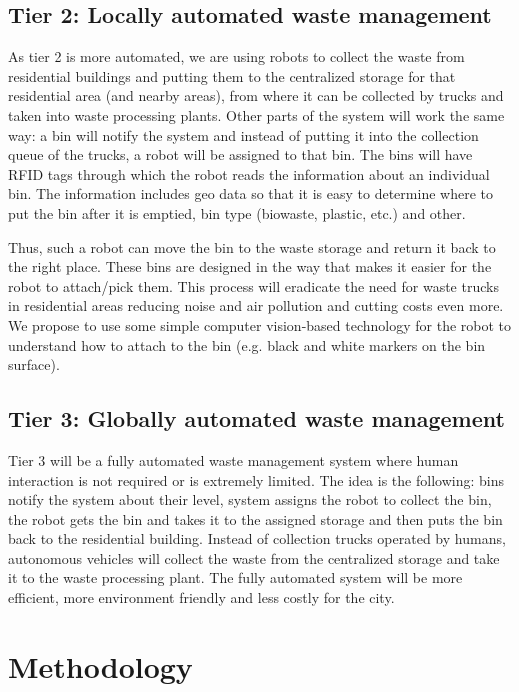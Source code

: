 \documentclass{article}
\begin{document}
\subsection{Tier 2: Locally automated waste management}

As tier 2 is more automated, we are using robots to collect the waste from residential buildings and
putting them to the centralized storage for that residential area (and nearby areas), from where it
can be collected by trucks and taken into waste processing plants. Other parts of the system will
work the same way: a bin will notify the system and instead of putting it into the collection queue
of the trucks, a robot will be assigned to that bin. The bins will have RFID tags through which the
robot reads the information about an individual bin. The information includes geo data so that it is
easy to determine where to put the bin after it is emptied, bin type (biowaste, plastic, etc.) and
other.

Thus, such a robot can move the bin to the waste storage and return it back to the right place.
These bins are designed in the way that makes it easier for the robot to attach/pick them. This
process will eradicate the need for waste trucks in residential areas reducing noise and air
pollution and cutting costs even more. We propose to use some simple computer vision-based
technology for the robot to understand how to attach to the bin (e.g. black and white markers on the
bin surface).

\subsection{Tier 3: Globally automated waste management}

Tier 3 will be a fully automated waste management system where human interaction is not required or
is extremely limited. The idea is the following: bins notify the system about their level, system
assigns the robot to collect the bin, the robot gets the bin and takes it to the assigned storage
and then puts the bin back to the residential building. Instead of collection trucks operated by
humans, autonomous vehicles will collect the waste from the centralized storage and take it to the
waste processing plant. The fully automated system will be more efficient, more environment friendly
and less costly for the city.

\section{Methodology}
\end{document}
